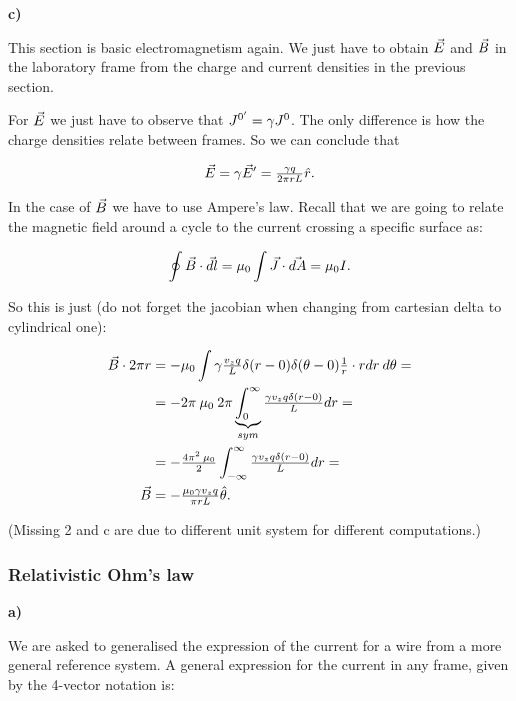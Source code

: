 \textbf{c)}

This section is basic electromagnetism again. We just have to obtain $\vec{E}$ and $ \vec{B}$ in the laboratory frame from the charge and current densities in the previous section.

For $\vec{E}$ we just have to observe that $J^{0' }  = \gamma J^{0 }$. The only difference is how the charge densities relate between frames. So we can conclude that

\begin{equation}
	\vec{E} = \gamma \vec{E}'  = \tfrac{\gamma q}{2\pi r L} \hat{r}.
\end{equation}

In the case of $\vec{B}$ we have to use Ampere's law. Recall that we are going to relate the magnetic field around a cycle to the current crossing a specific surface as:

\begin{equation}
	\oint \vec{B} \cdot \vec{dl} = \mu_{0} \int \vec{J} \cdot \vec{dA} = \mu_{0} I.
\end{equation}

So this is just (do not forget the jacobian when changing from cartesian delta to cylindrical one):

\begin{equation}
	\begin{split}
		\vec{B} \cdot 2 \pi r  &= - \mu_{0} \int \gamma \tfrac{v_{z} q }{L}  \delta(r-0)\delta (\theta -0) \tfrac{1}{r} \cdot r dr \: d\theta  =\\
		&= - 2\pi\: \mu_{0} \:2 \pi \underbrace{\int_{0}^{\infty}}_{sym} \tfrac{\gamma v_{z} q \delta (r-0)}{L} dr =\\
		&=  -\tfrac{4 \pi^{2}\: \mu_{0}}{2} \int_{-\infty}^{\infty} \tfrac{\gamma v_{z} q \delta (r-0)}{L} dr=\\
		\vec{B} &= -\tfrac{\mu_{0}\gamma v_{z} q}{\pi r L } \hat{\theta}.
	\end{split}
\end{equation}

(Missing 2 and c are due to different unit system for different computations.)






\subsubsection{Relativistic Ohm's law}\label{Relativistic Ohm's law}

\textbf{a)}

We are asked to generalised the expression of the current for a wire from a more general reference system. A general expression for the current in any frame, given by the 4-vector notation is:

